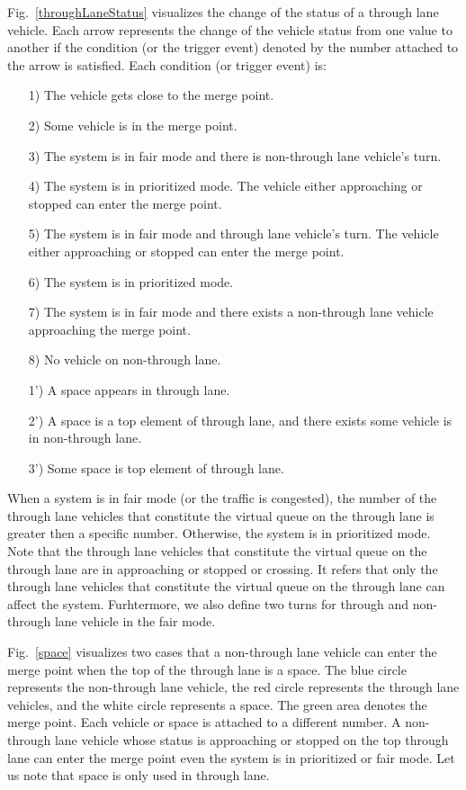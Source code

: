 \documentclass[10pt, conference, compsocconf]{IEEEtran}
\begin{document}
Fig.~\ref{throughLaneStatus} visualizes the change of the status
of a through lane vehicle.  Each arrow represents the change of the
vehicle status from one value to another if the condition (or the
trigger event) denoted by the number attached to the arrow is
satisfied.  Each condition (or trigger event) is:
\begin{itemize}[]
    \item[1)] The vehicle gets close to the merge point. %
    \item[2)] Some vehicle is in the merge point. %
    \item[3)] The system is in fair mode and there is non-through lane vehicle's turn. %
    \item[4)] The system is in prioritized mode. The vehicle either approaching or stopped 
    can enter the merge point. %
    \item[5)] The system is in fair mode and through lane vehicle's turn. The vehicle either 
    approaching or stopped can enter the merge point. %
    \item[6)] The system is in prioritized mode. %
    \item[7)] The system is in fair mode and there exists a non-through lane vehicle approaching the 
    merge point. %
    \item[8)] No vehicle on non-through lane.
    \item[1')] A space appears in through lane. %
    \item[2')] A space is a top element of through lane, and there exists some vehicle 
    is in non-through lane. %
    \item[3')] Some space is top element of through lane. %
\end{itemize}

When a system is in fair mode (or the traffic is congested), the number of the through lane
vehicles that constitute the virtual queue on the through lane is
greater then a specific number. Otherwise, the system is in prioritized mode.
Note that the through lane vehicles that constitute the virtual queue on the
through lane are in approaching or stopped or crossing.
It refers that only the through lane vehicles that constitute the virtual queue
on the through lane can affect the system. Furhtermore, we also define two turns 
for through and non-through lane vehicle in the fair mode.

Fig.~\ref{space} visualizes two cases that a non-through lane vehicle can enter
the merge point when the top of the through lane is a space.
The blue circle
represents the non-through lane vehicle, the red circle represents the
through lane vehicles, and the white circle represents a space. The green
area denotes the merge point. Each vehicle or space is attached to a
different number.
A non-through lane vehicle whose status is approaching or stopped on the top through lane
can enter the merge point even the system is in prioritized or fair mode.
Let us note that space is only used in through lane.
\end{document}
